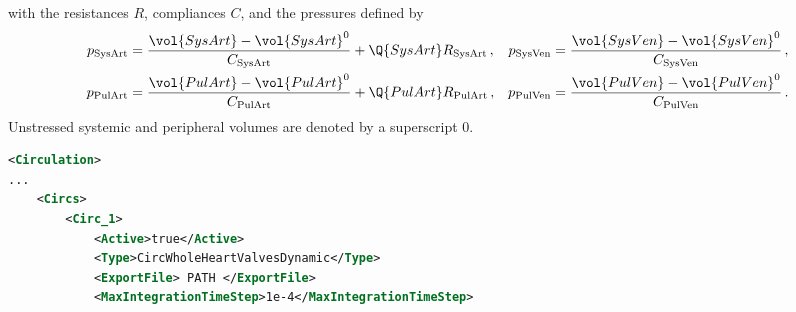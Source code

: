 with the resistances $R$, compliances $C$, and the pressures defined by
\begin{align}
    p_\text{SysArt} &= \frac{\vol{SysArt} - \vol{SysArt}^0}{C_\text{SysArt}} + \Q{SysArt} R_\text{SysArt} \,,&
    p_\text{SysVen} &= \frac{\vol{SysVen} - \vol{SysVen}^0}{C_\text{SysVen}} \,,\\
    p_\text{PulArt} &= \frac{\vol{PulArt} - \vol{PulArt}^0}{C_\text{PulArt}} + \Q{PulArt} R_\text{PulArt} \,,&
    p_\text{PulVen} &= \frac{\vol{PulVen} - \vol{PulVen}^0}{C_\text{PulVen}} \,. \label{eq:pressure}
\end{align}
Unstressed systemic and peripheral volumes are denoted by a superscript 0.
\begin{lstlisting}[language=XML,caption=.xml settings for the 4-chamber circulation model]
<Circulation>
...
    <Circs>
        <Circ_1>
            <Active>true</Active>
            <Type>CircWholeHeartValvesDynamic</Type>
            <ExportFile> PATH </ExportFile>
            <MaxIntegrationTimeStep>1e-4</MaxIntegrationTimeStep>
            

\end{lstlisting}
